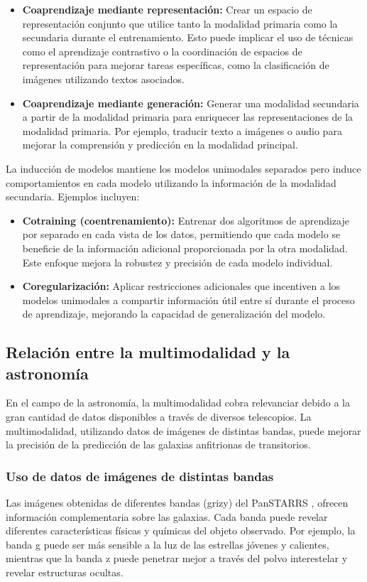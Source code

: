 \documentclass[../tesis.tex]{subfiles}
\begin{document}
\begin{itemize}
    \item \textbf{Coaprendizaje mediante representación:} Crear un espacio de representación conjunto que utilice tanto la modalidad primaria como la secundaria durante el entrenamiento. Esto puede implicar el uso de técnicas como el aprendizaje contrastivo o la coordinación de espacios de representación para mejorar tareas específicas, como la clasificación de imágenes utilizando textos asociados.
    \item \textbf{Coaprendizaje mediante generación:} Generar una modalidad secundaria a partir de la modalidad primaria para enriquecer las representaciones de la modalidad primaria. Por ejemplo, traducir texto a imágenes o audio para mejorar la comprensión y predicción en la modalidad principal.
\end{itemize}

La inducción de modelos mantiene los modelos unimodales separados pero induce comportamientos en cada modelo utilizando la información de la modalidad secundaria. Ejemplos incluyen:\par\null\par

\begin{itemize}
    \item \textbf{Cotraining (coentrenamiento):} Entrenar dos algoritmos de aprendizaje por separado en cada vista de los datos, permitiendo que cada modelo se beneficie de la información adicional proporcionada por la otra modalidad. Este enfoque mejora la robustez y precisión de cada modelo individual.
    \item \textbf{Coregularización:} Aplicar restricciones adicionales que incentiven a los modelos unimodales a compartir información útil entre sí durante el proceso de aprendizaje, mejorando la capacidad de generalización del modelo.
\end{itemize}

\subsection{Relación entre la multimodalidad y la astronomía}
En el campo de la astronomía, la multimodalidad cobra relevanciar debido a la gran cantidad de datos disponibles a través de diversos telescopios. La multimodalidad, utilizando datos de imágenes de distintas bandas, puede mejorar la precisión de la predicción de las galaxias anfitrionas de transitorios.

\subsubsection{Uso de datos de imágenes de distintas bandas}
Las imágenes obtenidas de diferentes bandas (grizy) del PanSTARRS \cite{panstarrs}, ofrecen información complementaria sobre las galaxias. Cada banda puede revelar diferentes características físicas y químicas del objeto observado. Por ejemplo, la banda g puede ser más sensible a la luz de las estrellas jóvenes y calientes, mientras que la banda z puede penetrar mejor a través del polvo interestelar y revelar estructuras ocultas.\par\null\par
\end{document}
